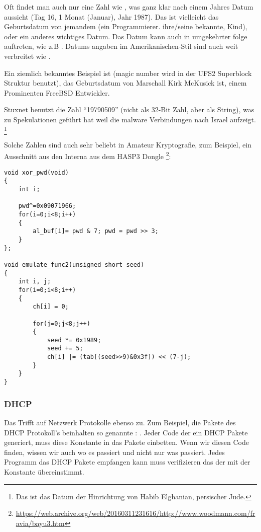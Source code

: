 
Oft findet man auch nur eine Zahl wie , was ganz klar nach einem Jahres Datum aussieht (Tag 16,  1 Monat (Januar),  Jahr 1987).
Das ist vielleicht das Geburtsdatum von jemandem (ein Programmierer. ihre/seine bekannte, Kind), oder ein anderes wichtiges Datum.
Das Datum kann auch in umgekehrter folge auftreten, wie z.B . 
Datums angaben im Amerikanischen-Stil sind auch weit verbreitet wie .

Ein ziemlich bekanntes Beispiel ist   (magic number wird in der UFS2 Superblock Struktur benutzt), das 
Geburtsdatum von Marschall Kirk McKusick ist, einem Prominenten FreeBSD Entwickler. 


Stuxnet benutzt die Zahl ``19790509'' (nicht als 32-Bit Zahl, aber als String), was zu Spekulationen gef\"uhrt hat
weil die malware Verbindungen nach Israel aufzeigt.
\footnote{Das ist das Datum der Hinrichtung von Habib Elghanian, persischer Jude.}

Solche Zahlen sind auch sehr beliebt in Amateur Kryptografie, zum Beispiel, ein Ausschnitt aus den  Interna aus dem HASP3 Dongle %
\footnote{\url{https://web.archive.org/web/20160311231616/http://www.woodmann.com/fravia/bayu3.htm}}:

\begin{lstlisting}[style=customc]
void xor_pwd(void) 
{ 
	int i; 
	
	pwd^=0x09071966;
	for(i=0;i<8;i++) 
	{ 
		al_buf[i]= pwd & 7; pwd = pwd >> 3; 
	} 
};

void emulate_func2(unsigned short seed)
{ 
	int i, j; 
	for(i=0;i<8;i++) 
	{ 
		ch[i] = 0; 
		
		for(j=0;j<8;j++)
		{ 
			seed *= 0x1989; 
			seed += 5; 
			ch[i] |= (tab[(seed>>9)&0x3f]) << (7-j); 
		}
	} 
}
\end{lstlisting}

\subsubsection{DHCP}

Das Trifft auf Netzwerk Protokolle ebenso zu. 
Zum Beispiel, die Pakete des DHCP Protokoll's beinhalten so genannte : .
Jeder Code der ein DHCP Pakete generiert, muss diese Konstante in das Pakete einbetten.
Wenn wir diesen Code finden, wissen wir auch wo es passiert und nicht nur was passiert.
Jedes Programm das DHCP Pakete empfangen kann muss verifizieren das der  mit der Konstante 
\"ubereinstimmt. 

